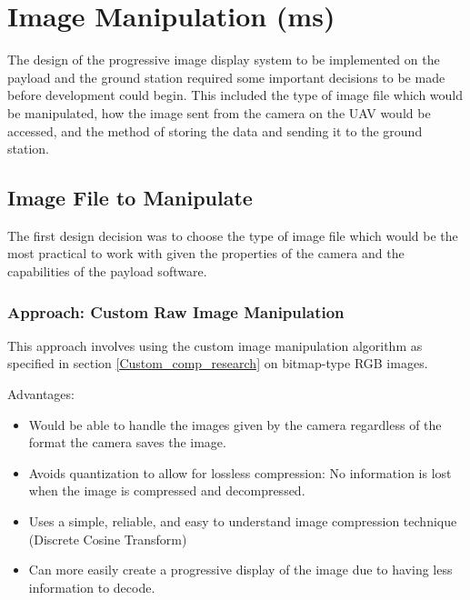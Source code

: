 
\section{Image Manipulation (ms)}
\label{sec:progressiveimagedisplay}

The design of the progressive image
display system to be implemented on the
payload and the ground station required some
important decisions to be made before 
development could begin. This included
the type of image file which would be
manipulated, how the image sent from the camera on 
the UAV would be accessed,
and the method of storing the data
and sending it to the ground station.

\subsection{Image File to Manipulate}

The first design decision was to choose the type of image 
file which would be the most practical to work with given
the properties of the camera and the
capabilities of the payload software.

\subsubsection{Approach: Custom Raw Image Manipulation}

This approach involves using the custom image 
manipulation algorithm as specified 
in section \ref{Custom_comp_research} on bitmap-type RGB images.

Advantages:
\begin{itemize}
	\item Would be able to handle the images
		given by the camera regardless of the format
		the camera saves the image.
	\item Avoids quantization to allow 
		for lossless compression: No information is
		lost when the image is 
		compressed and decompressed.
	\item Uses a simple, reliable, and easy to 
		understand image compression technique
		(Discrete Cosine Transform)
	\item Can more easily create a progressive
		display of the image due to having less
		information to decode.
\end{itemize}

